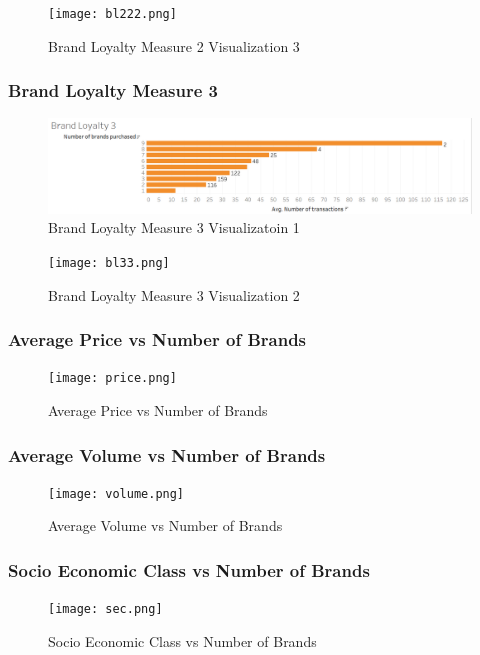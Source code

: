 \documentclass[11pt]{article}
\begin{document}
\begin{figure}[H]
    \centering
    \texttt{[image: bl222.png]}
    \caption{Brand Loyalty Measure 2 Visualization 3 }
    \label{lr}
\end{figure}

\subsubsection{Brand Loyalty Measure 3}
\begin{figure}[H]
    \centering
    \includegraphics[width=1\columnwidth]{pics/bl3.png}
    \caption{Brand Loyalty Measure 3 Visualizatoin 1}
    \label{lr}
\end{figure}

\begin{figure}[H]
    \centering
    \texttt{[image: bl33.png]}
    \caption{Brand Loyalty Measure 3 Visualization 2}
    \label{lr}
\end{figure}

\subsubsection{Average Price vs Number of Brands}
\begin{figure}[H]
    \centering
    \texttt{[image: price.png]}
    \caption{Average Price vs Number of Brands}
    \label{lr}
\end{figure}

\subsubsection{Average Volume vs Number of Brands}
\begin{figure}[H]
    \centering
    \texttt{[image: volume.png]}
    \caption{Average Volume vs Number of Brands}
    \label{lr}
\end{figure}

\subsubsection{Socio Economic Class vs Number of Brands}
\begin{figure}[H]
    \centering
    \texttt{[image: sec.png]}
    \caption{Socio Economic Class vs Number of Brands}
    \label{lr}
\end{figure}
\end{document}

